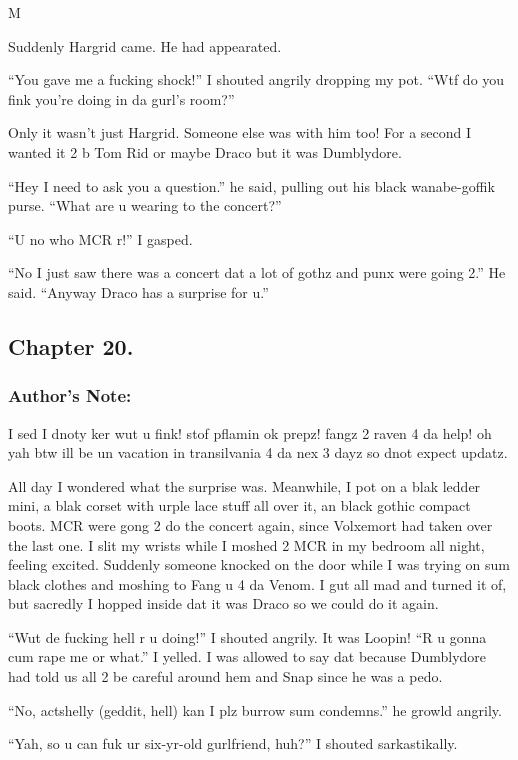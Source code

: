 M\documentclass{article}
\begin{document}
Suddenly Hargrid came. He had appearated.

“You gave me a fucking shock!” I shouted angrily dropping my pot. “Wtf do you fink you’re doing in da gurl’s room?”

Only it wasn’t just Hargrid. Someone else was with him too! For a second I wanted it 2 b Tom Rid or maybe Draco but it was Dumblydore.

“Hey I need to ask you a question.” he said, pulling out his black wanabe-goffik purse. “What are u wearing to the concert?”

“U no who MCR r!” I gasped.

“No I just saw there was a concert dat a lot of gothz and punx were going 2.” He said. “Anyway Draco has a surprise for u.”

\clearpage\nolinenumbers
\subsection*{Chapter 20.}

\subsubsection*{Author's Note: }I sed I dnoty ker wut u fink! stof pflamin ok prepz! fangz 2 raven 4 da help! oh yah btw ill be un vacation in transilvania 4 da nex 3 dayz so dnot expect updatz.

\textbreak
\linenumbers\resetlinenumber

All day I wondered what the surprise was. Meanwhile, I pot on a blak ledder mini, a blak corset with urple lace stuff all over it, an black gothic compact boots. MCR were gong 2 do the concert again, since Volxemort had taken over the last one. I slit my wrists while I moshed 2 MCR in my bedroom all night, feeling excited. Suddenly someone knocked on the door while I was trying on sum black clothes and moshing to Fang u 4 da Venom. I gut all mad and turned it of, but sacredly I hopped inside dat it was Draco so we could do it again.

“Wut de fucking hell r u doing!” I shouted angrily. It was Loopin! “R u gonna cum rape me or what.” I yelled. I was allowed to say dat because Dumblydore had told us all 2 be careful around hem and Snap since he was a pedo.

“No, actshelly (geddit, hell) kan I plz burrow sum condemns.” he growld angrily.

“Yah, so u can fuk ur six-yr-old gurlfriend, huh?” I shouted sarkastikally.
\end{document}
